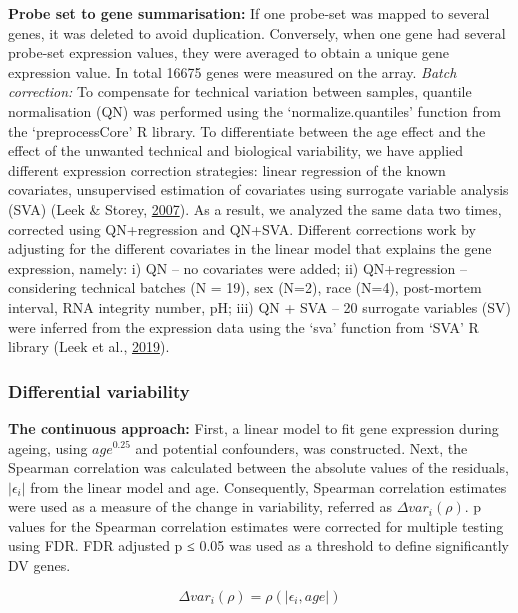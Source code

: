 \documentclass[12pt,twoside]{unicam}
\begin{document}
\textbf{Probe set to gene summarisation:} If one probe-set was mapped to several genes, it was deleted to avoid duplication. Conversely, when one gene had several probe-set expression values, they were averaged to obtain a unique gene expression value. In total 16675 genes were measured on the array.
\emph{Batch correction:} To compensate for technical variation between samples, quantile normalisation (QN) was performed using the `normalize.quantiles' function from the `preprocessCore' R library. To differentiate between the age effect and the effect of the unwanted technical and biological variability, we have applied different expression correction strategies: linear regression of the known covariates, unsupervised estimation of covariates using surrogate variable analysis (SVA) (Leek \& Storey, \protect\hyperlink{ref-Leek2007}{2007}). As a result, we analyzed the same data two times, corrected using QN+regression and QN+SVA. Different corrections work by adjusting for the different covariates in the linear model that explains the gene expression, namely: i) QN -- no covariates were added; ii) QN+regression -- considering technical batches (N = 19), sex (N=2), race (N=4), post-mortem interval, RNA integrity number, pH; iii) QN + SVA -- 20 surrogate variables (SV) were inferred from the expression data using the `sva' function from `SVA' R library (Leek et al., \protect\hyperlink{ref-svapack}{2019}).

\hypertarget{differential-variability}{%
\subsubsection{Differential variability}\label{differential-variability}}

\textbf{The continuous approach:} First, a linear model to fit gene expression during ageing, using \(age^{0.25}\) and potential confounders, was constructed. Next, the Spearman correlation was calculated between the absolute values of the residuals, \(|\epsilon_i|\) from the linear model and age. Consequently, Spearman correlation estimates were used as a measure of the change in variability, referred as \(\Delta var_i(\rho)\). p values for the Spearman correlation estimates were corrected for multiple testing using FDR. FDR adjusted p ≤ 0.05 was used as a threshold to define significantly DV genes.

\[\Delta var_i(\rho)=\rho(|\epsilon_i,age|)\]
\end{document}

